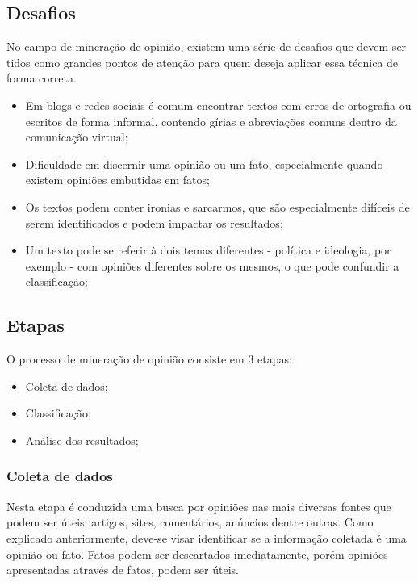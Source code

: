 \subsection{Desafios}

No campo de mineração de opinião, existem uma série de desafios que devem ser tidos como grandes pontos de atenção para quem deseja aplicar essa técnica de forma correta. 

\begin{itemize}
	\item Em blogs e redes sociais é comum encontrar textos com erros de ortografia ou escritos de forma informal, contendo gírias e abreviações comuns dentro da comunicação virtual;
	\item Dificuldade em discernir uma opinião ou um fato, especialmente quando existem opiniões embutidas em fatos;
	\item Os textos podem conter ironias e sarcarmos, que são especialmente difíceis de serem identificados e podem impactar os resultados;
	\item Um texto pode se referir à dois temas diferentes - política e ideologia, por exemplo - com opiniões diferentes sobre os mesmos, o que pode confundir a classificação;
\end{itemize}

\subsection{Etapas}

O processo de mineração de opinião consiste em 3 etapas: \cite{mineracaoopiniaoufsc}

\begin{itemize}
	\item Coleta de dados;
	\item Classificação;
	\item Análise dos resultados;
\end{itemize}

\subsubsection{Coleta de dados}

Nesta etapa é conduzida uma busca por opiniões nas mais diversas fontes que podem ser úteis: artigos, sites, comentários, anúncios dentre outras. Como explicado anteriormente, deve-se visar identificar se a informação coletada é uma opinião ou fato. Fatos podem ser descartados imediatamente, porém opiniões apresentadas através de fatos, podem ser úteis.


